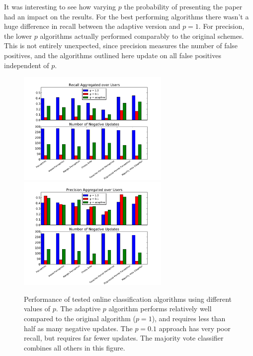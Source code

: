 \documentclass[12pt]{article}
\begin{document}
It was interesting to see how varying $p$ the probability of presenting the paper had an impact on the results.  For the best performing algorithms there wasn't a huge difference in recall between the adaptive version and $p = 1$.  For precision, the lower $p$ algorithms actually performed comparably to the original schemes.  This is not entirely unexpected, since precision measures the number of false positives, and the algorithms outlined here update on all false positives independent of $p$. \\

\begin{figure}[h!]\centering
\includegraphics[width=0.65\textwidth]{EveryoneRecallPaper.pdf}
\includegraphics[width=0.65\textwidth]{EveryonePrecisionPaper.pdf}
\label{fig:PrecisionandRecall}
\caption{Performance of tested online classification algorithms using different values of $p$.  The adaptive $p$ algorithm performs relatively well compared to the original algorithm ($p = 1$), and requires less than half as many negative updates. The $p = 0.1$ approach has very poor recall, but requires far fewer updates.  The majority vote classifier combines all others in this figure.}
\end{figure}
\end{document}
